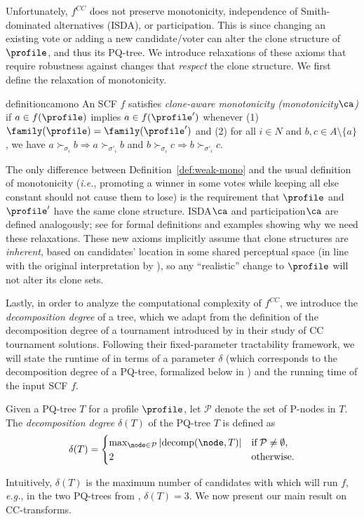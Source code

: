 Unfortunately, $f^{CC}$ does not preserve monotonicity, independence of Smith-dominated alternatives (ISDA), or participation. This is since changing an existing vote or adding a new candidate/voter can alter the clone structure of $\profile$, and thus its PQ-tree. We introduce relaxations of these axioms that require robustness against changes that \textit{respect} the clone structure. We first define the relaxation of monotonicity. 
\begin{restatable}{definition}{camono}\label{def:weak-mono}
    An SCF $f$ satisfies \emph{clone-aware monotonicity (monotonicity$\ca$)} if $a \in f(\profile)$ implies $a \in f(\profile')$ whenever (1) $\family(\profile)=\family(\profile')$ and (2) for all $i \in N$ and $b,c \in A \setminus\{a\}$, we have $a \succ_{\sigma_i} b \Rightarrow a \succ_{\sigma'_i} b$ and $b \succ_{\sigma_i} c \Rightarrow b \succ_{\sigma'_i} c$.
\end{restatable}
The only difference between Definition~\ref{def:weak-mono} and the usual definition of monotonicity (\emph{i.e.}, promoting a winner in some votes while keeping all else constant should not cause them to lose) is the requirement that $\profile$ and $\profile'$ have the same clone structure. ISDA$\ca$ and participation$\ca$ are defined analogously; see  for formal definitions and examples showing why we need these relaxations. These new axioms implicitly assume that clone structures are \textit{inherent}, based on candidates' location in some shared perceptual space (in line with the original interpretation by \citet{Tideman87:Independence}), so any ``realistic'' change to $\profile$ will not alter its clone sets.

Lastly, in order to analyze the computational complexity of $f^{CC}$, we introduce the \emph{decomposition degree} of a tree, which we adapt from the definition of the decomposition degree of a tournament introduced by \citet{Brandt11:Fixed} in their study of CC tournament solutions. 
Following their fixed-parameter tractability framework, we will state the runtime of  in terms of a parameter $\delta$ (which corresponds to the decomposition degree of a PQ-tree, formalized below in ) and the running time of the input SCF $f$. 

\begin{definition}\label{def:delta}
    Given a PQ-tree $T$ for a profile $\profile$, let $\mathcal{P}$ denote the set of P-nodes in $T$. 
    The \emph{decomposition degree} $\delta(T)$ of the PQ-tree $T$ is defined as
    \begin{align*}
        \delta(T)= 
        \begin{cases}
            \max_{\node \in \mathcal{P}} |\text{decomp}(\node,T)| & \mathrm{ if } \, \mathcal{P} \neq \emptyset, \\ 
            2 & \mathrm{otherwise}.
        \end{cases}
    \end{align*}
\end{definition}
Intuitively, $\delta(T)$ is the maximum number of candidates with which  will run $f$, \emph{e.g.}, in the two PQ-trees from , $\delta(T)=3$. We now present our main result on CC-transforms.

